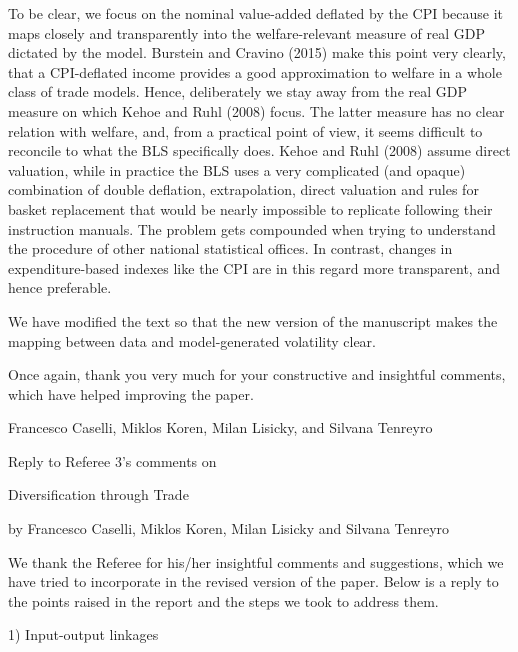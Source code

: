 \documentclass[12pt]{article}
\begin{document}
To be clear, we focus on the nominal value-added deflated by the CPI because
it maps closely and transparently into the welfare-relevant measure of real
GDP dictated by the model. Burstein and Cravino (2015) make this point very clearly, that a CPI-deflated income provides a good approximation to welfare in a whole class of trade models.
Hence, deliberately we stay away from the real
GDP measure on which Kehoe and Ruhl (2008) focus. The latter measure has no
clear relation with welfare, and, from a practical point of view, it seems difficult to reconcile to what the BLS specifically does. Kehoe and Ruhl (2008)
assume direct valuation, while in practice the BLS uses a very complicated
(and opaque) combination of double deflation, extrapolation, direct
valuation and rules for basket replacement that would be nearly impossible
to replicate following their instruction manuals. The problem gets
compounded when trying to understand the procedure of other national
statistical offices. In contrast, changes in expenditure-based indexes like
the CPI are in this regard more transparent, and hence preferable.

We have modified the text so that the new version of the manuscript makes
the mapping between data and model-generated volatility clear.

\bigskip

Once again, thank you very much for your constructive and insightful
comments, which have helped improving the paper.\medskip \medskip \bigskip

Francesco Caselli, Miklos Koren, Milan Lisicky, and Silvana
Tenreyro\pagebreak

\begin{center}
\thispagestyle{plain}\setcounter{page}{1}

Reply to Referee 3's comments on

{\Large Diversification through Trade}

by Francesco Caselli, Miklos Koren, Milan Lisicky and Silvana
Tenreyro\medskip \medskip \bigskip
\end{center}

We thank the Referee for his/her insightful comments and suggestions, which
we have tried to incorporate in the revised version of the paper. Below is a
reply to the points raised in the report and the steps we took to address
them.

\bigskip

1) Input-output linkages
\end{document}
